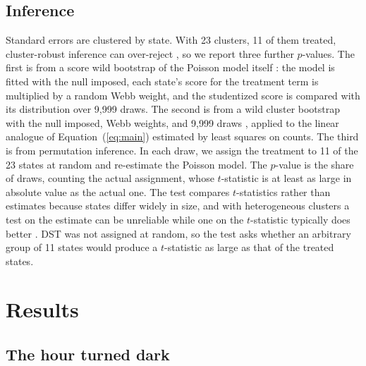 \subsection{Inference}

Standard errors are clustered by state. With 23 clusters, 11 of them treated, cluster-robust inference can over-reject \citep{cameron2008bootstrap}, so we report three further $p$-values. The first is from a score wild bootstrap of the Poisson model itself \citep{kline2012score}: the model is fitted with the null imposed, each state's score for the treatment term is multiplied by a random Webb weight, and the studentized score is compared with its distribution over 9,999 draws. The second is from a wild cluster bootstrap with the null imposed, Webb weights, and 9,999 draws \citep{webb2023reworking}, applied to the linear analogue of Equation~(\ref{eq:main}) estimated by least squares on counts. The third is from permutation inference. In each draw, we assign the treatment to 11 of the 23 states at random and re-estimate the Poisson model. The $p$-value is the share of draws, counting the actual assignment, whose $t$-statistic is at least as large in absolute value as the actual one. The test compares $t$-statistics rather than estimates because states differ widely in size, and with heterogeneous clusters a test on the estimate can be unreliable while one on the $t$-statistic typically does better \citep{mackinnon2020randomization}. DST was not assigned at random, so the test asks whether an arbitrary group of 11 states would produce a $t$-statistic as large as that of the treated states.

\section{Results}\label{sec:results}

\subsection{The hour turned dark}\label{sec:firststage}

